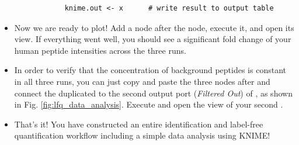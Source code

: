 \begin{itemize}
\begin{lstlisting}
            knime.out <- x      # write result to output table
        \end{lstlisting}
    \item Now we are ready to plot! Add a  node  after the  node, execute it, and open its view. If everything went well, you should see a significant fold change of your human peptide intensities across the three runs.
    \item In order to verify that the concentration of background peptides is constant in all three runs, you can just copy and paste the three nodes after  and connect the duplicated  to the second output port (\textit{Filtered Out}) of , as shown in Fig. \ref{fig:lfq_data_analysis}. Execute and open the view of your second .
    \item That's it! You have constructed an entire identification and label-free quantification workflow including a simple data analysis using KNIME!
\end{itemize}




